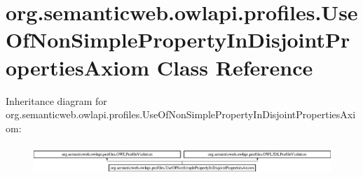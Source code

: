 \hypertarget{classorg_1_1semanticweb_1_1owlapi_1_1profiles_1_1_use_of_non_simple_property_in_disjoint_properties_axiom}{\section{org.\-semanticweb.\-owlapi.\-profiles.\-Use\-Of\-Non\-Simple\-Property\-In\-Disjoint\-Properties\-Axiom Class Reference}
\label{classorg_1_1semanticweb_1_1owlapi_1_1profiles_1_1_use_of_non_simple_property_in_disjoint_properties_axiom}
}
Inheritance diagram for org.\-semanticweb.\-owlapi.\-profiles.\-Use\-Of\-Non\-Simple\-Property\-In\-Disjoint\-Properties\-Axiom\-:\begin{figure}[H]
\begin{center}
\leavevmode
\includegraphics[height=1.138211cm]{classorg_1_1semanticweb_1_1owlapi_1_1profiles_1_1_use_of_non_simple_property_in_disjoint_properties_axiom}
\end{center}
\end{figure}
